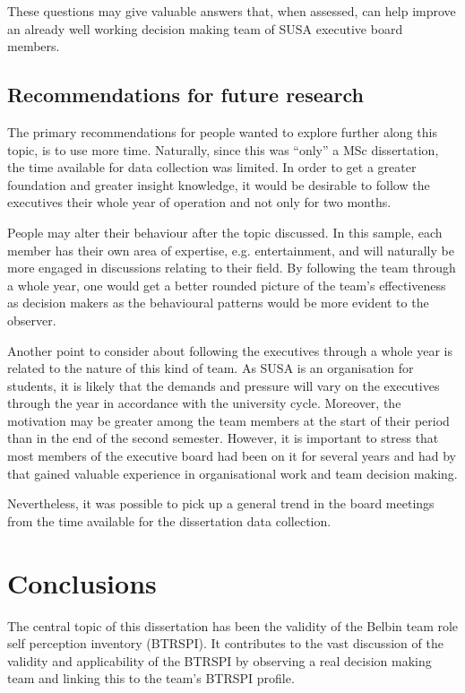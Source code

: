 \documentclass[a4paper,12pt,titlepage]{report}
\begin{document}
  These questions may give valuable answers that, when assessed, can
  help improve an already well working decision making team of
  SUSA executive board members.

  \section{Recommendations for future research}
  The primary recommendations for people wanted to explore further along this
  topic, is to use more time. Naturally, since this was ``only'' a MSc dissertation,
  the time available for data collection was limited. In order to get a greater
  foundation and greater insight knowledge, it would be desirable to follow the
  executives their whole year of operation and not only for two months.

  People may alter their behaviour after the topic discussed. In this sample, each
  member has their own area of expertise, e.g. entertainment, and will naturally
  be more engaged in discussions relating to their field. By following the team
  through a whole year, one would get a better rounded picture of the team's
  effectiveness as decision makers as the behavioural patterns would be more
  evident to the observer.

  Another point to consider about following the executives through a whole
  year is related to the nature of this kind of team. As SUSA is an organisation
  for students, it is likely that the demands and pressure will vary on the executives
  through the year in accordance with the university cycle. Moreover, the motivation may
  be greater among the team members at the start of their period than in the end of
  the second semester. However, it is important to stress that most members of the
  executive board had been on it for several years and had by that gained
  valuable experience in organisational work and team decision making.
  
  Nevertheless, it was possible to pick up a general trend in the
  board meetings from the time available for the dissertation data collection.

  \chapter{Conclusions}
  The central topic of this dissertation has been the validity of the Belbin
  team role self perception inventory (BTRSPI).
  It contributes to the vast discussion of the
  validity and applicability of the BTRSPI by observing a real decision making team
  and linking this to the team's BTRSPI profile.
\end{document}
